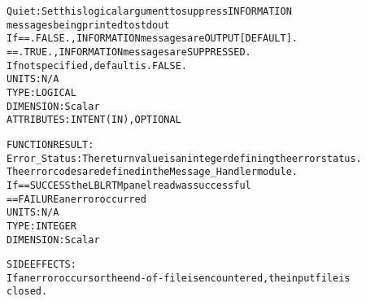 \begin{alltt}
        Quiet:         Set this logical argument to suppress INFORMATION
                       messages being printed to stdout
                       If == .FALSE., INFORMATION messages are OUTPUT [DEFAULT].
                          == .TRUE.,  INFORMATION messages are SUPPRESSED.
                       If not specified, default is .FALSE.
                       UNITS:      N/A
                       TYPE:       LOGICAL
                       DIMENSION:  Scalar
                       ATTRIBUTES: INTENT(IN), OPTIONAL
 
  FUNCTION RESULT:
        Error_Status:  The return value is an integer defining the error status.
                       The error codes are defined in the Message_Handler module.
                       If == SUCCESS the LBLRTM panel read was successful
                          == FAILURE an error occurred
                       UNITS:      N/A
                       TYPE:       INTEGER
                       DIMENSION:  Scalar
 
  SIDE EFFECTS:
        If an error occurs or the end-of-file is encountered, the input file is
        closed.
 
  \end{alltt}
